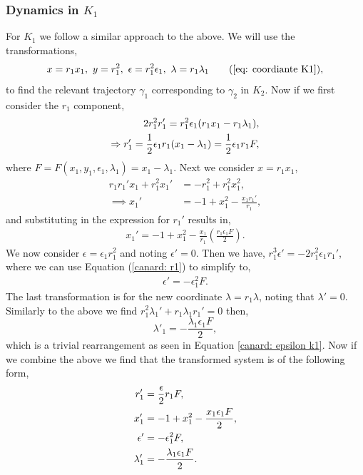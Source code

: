 \subsubsection{Dynamics in \texorpdfstring{$K_1$}{K1}}\label{sec:dynamics-in-texorpdfstringk1k1}
For $K_1$ we follow a similar approach to the above. We will use the transformations, 
\begin{equation}
x=r_1x_1, \ y=r_1^2, \ \epsilon=r_1^2\epsilon_1, \ \lambda=r_1\lambda_1 \tag{\ref{eq: coordiante K1}},
\end{equation}
to find the relevant trajectory $\gamma_1$ corresponding to $\gamma_2$ in $K_2$. Now if we first consider the $r_1$ component, 
\begin{align}
2r_1^2r_1'=r_1^2\epsilon_1(r_1x_1-r_1\lambda_1),\notag\\ \label{canard: r1}
\Rightarrow r_1' = \frac{1}{2} \epsilon_1r_1 (x_1 - \lambda_1) = \frac{1}{2} \epsilon_1r_1F,
\end{align}
where $F=F(x_1,y_1,\epsilon_1,\lambda_1)=x_1-\lambda_1$. Next we consider $x=r_1x_1$,
\begin{align*}
r_1r_1'x_1+r_1^2x_1'&=-r_1^2+r_1^2x_1^2,\\
\implies x_1'&=-1+x_1^2-\frac{x_1r_1'}{r_1},
\end{align*}
and substituting in the expression for $r_1'$ results in,
\begin{align}
x_1'=-1+x_1^2-\frac{x_1}{r_1}\left(\frac{r_1\epsilon_1F}{2}\right). \label{eq: canard x1}
\end{align}
We now consider $\epsilon=\epsilon_1r_1^2$ and noting $\epsilon'=0$. Then we have, $r_1^3\epsilon'=-2r_1^2\epsilon_1r_1'$, where we can use Equation (\ref{canard: r1}) to simplify to,
\begin{align}
\epsilon'=-\epsilon_1^2F. \label{canard: epsilon k1}
\end{align}
The last transformation is for the new coordinate $\lambda=r_1\lambda$, noting that $\lambda'=0$. Similarly to the above we find $r_1^2\lambda_1'+r_1\lambda_1r_1'=0$ then, 
\begin{equation}
\lambda'_1=-\frac{\lambda_1\epsilon_1F}{2}, 
\end{equation}
which is a trivial rearrangement as seen in Equation \ref{canard: epsilon k1}. Now if we combine the above we find that the transformed system is of the following form,
\begin{subequations}
	\begin{align}
	r_1'&=\frac{\epsilon}{2}r_1F, \\ \notag
	x_1'&=-1+x_1^2-\frac{x_1\epsilon_1F}{2},\\
	\epsilon'&=-\epsilon_1^2F,\\ \notag
	\lambda'_1&=-\frac{\lambda_1\epsilon_1F}{2}. \notag
	\end{align}
	\label{canard: system of equations}
\end{subequations}
